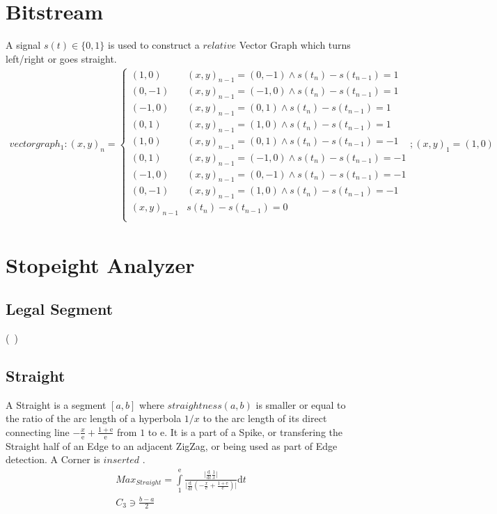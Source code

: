 \documentclass{report}
\begin{document}
\section{Bitstream}
A signal $s(t)\in\{0,1\}$ is used to construct a $relative$ Vector Graph which turns left/right or goes straight.
\begin{align}
vectorgraph_{1}: (x,y)_{n}=
\begin{cases}
(1,0) & (x,y)_{n-1}= (0,-1)\land s(t_{n})-s(t_{n-1})=1\\
(0,-1) & (x,y)_{n-1}= (-1,0)\land s(t_{n})-s(t_{n-1})=1\\
(-1,0) & (x,y)_{n-1}= (0,1)\land s(t_{n})-s(t_{n-1})=1\\
(0,1) & (x,y)_{n-1}= (1,0)\land s(t_{n})-s(t_{n-1})=1\\
(1,0) & (x,y)_{n-1}= (0,1)\land s(t_{n})-s(t_{n-1})=-1\\
(0,1) & (x,y)_{n-1}= (-1,0)\land s(t_{n})-s(t_{n-1})=-1\\
(-1,0) & (x,y)_{n-1}= (0,-1)\land s(t_{n})-s(t_{n-1})=-1\\
(0,-1) & (x,y)_{n-1}= (1,0)\land s(t_{n})-s(t_{n-1})=-1\\
(x,y)_{n-1} & s(t_{n})-s(t_{n-1})=0\\
\end{cases};(x,y)_{1}=(1,0)
\end{align}

\section{Stopeight Analyzer}

\subsection{Legal Segment}
(~\cite[Riemann Integrable?]{Widon})

\subsection{Straight}
A Straight is a segment $[a,b]$ where $straightness(a,b)$ is smaller or equal to the ratio of the arc length of a hyperbola $1/x$ to the arc length of its direct connecting line $-\frac{x}{\mathrm{e}}+\frac{1+\mathrm{e}}{\mathrm{e}}$ from $1$ to $\mathrm{e}$. It is a part of a Spike, or transfering the Straight half of an Edge to an adjacent ZigZag, or being used as part of Edge detection. A Corner is $inserted$ .
\begin{align}
Max_{Straight}=\int \limits _{1}^{\mathrm{e}}\frac{\lvert\frac{\mathrm{d}}{\mathrm{d}t}\frac{1}{x}\rvert}{\lvert\frac{\mathrm{d}}{\mathrm{d}t}(-\frac{x}{\mathrm{e}}+\frac{1+\mathrm{e}}{\mathrm{e}})\rvert}\mathrm{d}t\\
C_{3} \ni \frac{b-a}{2}
\end{align}
\end{document}
